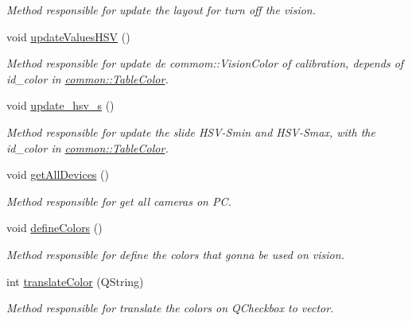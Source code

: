 \begin{DoxyCompactItemize}
\begin{DoxyCompactList}\small\item\em Method responsible for update the layout for turn off the vision. \end{DoxyCompactList}\item 
void \hyperlink{classMainWindow_aee8cb88ae764bcfb12963ab2a1fa9e65}{update\+Values\+H\+SV} ()\hypertarget{classMainWindow_aee8cb88ae764bcfb12963ab2a1fa9e65}{}\label{classMainWindow_aee8cb88ae764bcfb12963ab2a1fa9e65}

\begin{DoxyCompactList}\small\item\em Method responsible for update de commom\+::\+Vision\+Color of calibration, depends of id\+\_\+color in \hyperlink{structcommon_1_1TableColor}{common\+::\+Table\+Color}. \end{DoxyCompactList}\item 
void \hyperlink{classMainWindow_a6a418df110068fb09bd60ce785c05926}{update\+\_\+hsv\+\_\+s} ()\hypertarget{classMainWindow_a6a418df110068fb09bd60ce785c05926}{}\label{classMainWindow_a6a418df110068fb09bd60ce785c05926}

\begin{DoxyCompactList}\small\item\em Method responsible for update the slide H\+S\+V-\/\+Smin and H\+S\+V-\/\+Smax, with the id\+\_\+color in \hyperlink{structcommon_1_1TableColor}{common\+::\+Table\+Color}. \end{DoxyCompactList}\item 
void \hyperlink{classMainWindow_a0ec10b5c5cd98c5aa086bf91793c9d7e}{get\+All\+Devices} ()
\begin{DoxyCompactList}\small\item\em Method responsible for get all cameras on PC. \end{DoxyCompactList}\item 
void \hyperlink{classMainWindow_a62c1577587f33bc89c823d3ea3f23bda}{define\+Colors} ()\hypertarget{classMainWindow_a62c1577587f33bc89c823d3ea3f23bda}{}\label{classMainWindow_a62c1577587f33bc89c823d3ea3f23bda}

\begin{DoxyCompactList}\small\item\em Method responsible for define the colors that gonna be used on vision. \end{DoxyCompactList}\item 
int \hyperlink{classMainWindow_a7d8385cfb0a4a1bbb38ac943010962d9}{translate\+Color} (Q\+String)\hypertarget{classMainWindow_a7d8385cfb0a4a1bbb38ac943010962d9}{}\label{classMainWindow_a7d8385cfb0a4a1bbb38ac943010962d9}

\begin{DoxyCompactList}\small\item\em Method responsible for translate the colors on Q\+Checkbox to vector. \end{DoxyCompactList}\end{DoxyCompactItemize}

